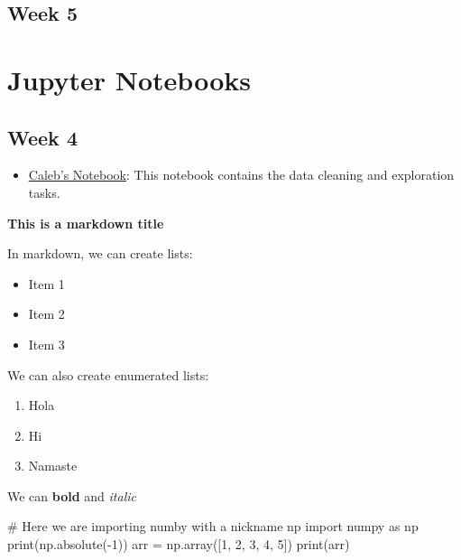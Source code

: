 \documentclass[
  letterpaper,
  DIV=11,
  numbers=noendperiod]{scrreprt}
\newenvironment{Shaded}{\begin{snugshade}}{\end{snugshade}}
\newcommand{\BuiltInTok}[1]{\textcolor[rgb]{0.00,0.23,0.31}{#1}}
\newcommand{\CommentTok}[1]{\textcolor[rgb]{0.37,0.37,0.37}{#1}}
\newcommand{\DecValTok}[1]{\textcolor[rgb]{0.68,0.00,0.00}{#1}}
\newcommand{\ImportTok}[1]{\textcolor[rgb]{0.00,0.46,0.62}{#1}}
\newcommand{\NormalTok}[1]{\textcolor[rgb]{0.00,0.23,0.31}{#1}}
\newcommand{\OperatorTok}[1]{\textcolor[rgb]{0.37,0.37,0.37}{#1}}
\providecommand{\tightlist}{%
  \setlength{\itemsep}{0pt}\setlength{\parskip}{0pt}}\usepackage{longtable,booktabs,array}
\begin{document}
\subsection{Week 5}\label{week-5-1}

\section{Jupyter Notebooks}\label{jupyter-notebooks-1}

\subsection{Week 4}\label{week-4-1}

\begin{itemize}
\tightlist
\item
  \href{Tut2_Python_Pena_092024.ipynb}{Caleb's Notebook}: This notebook
  contains the data cleaning and exploration tasks.
\end{itemize}

\textbf{This is a markdown title}

In markdown, we can create lists:

\begin{itemize}
\tightlist
\item
  Item 1
\item
  Item 2
\item
  Item 3
\end{itemize}

We can also create enumerated lists:

\begin{enumerate}
\def\labelenumi{\arabic{enumi}.}
\tightlist
\item
  Hola
\item
  Hi
\item
  Namaste
\end{enumerate}

We can \textbf{bold} and \emph{italic}

\begin{Shaded}
\begin{Highlighting}[]
\CommentTok{\# Here we are importing numby with a nickname np}
\ImportTok{import}\NormalTok{ numpy }\ImportTok{as}\NormalTok{ np}
\BuiltInTok{print}\NormalTok{(np.absolute(}\OperatorTok{{-}}\DecValTok{1}\NormalTok{))}
\NormalTok{arr }\OperatorTok{=}\NormalTok{ np.array([}\DecValTok{1}\NormalTok{, }\DecValTok{2}\NormalTok{, }\DecValTok{3}\NormalTok{, }\DecValTok{4}\NormalTok{, }\DecValTok{5}\NormalTok{])}
\BuiltInTok{print}\NormalTok{(arr)}
\end{Highlighting}
\end{Shaded}
\end{document}
